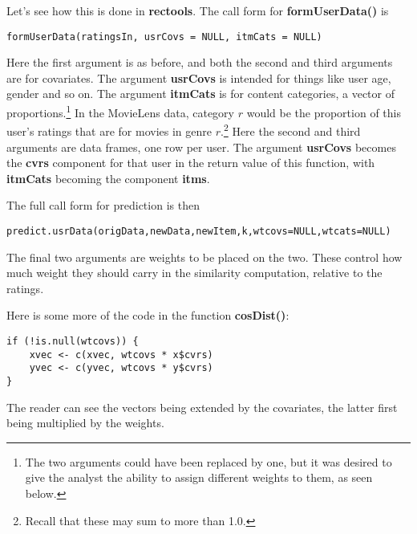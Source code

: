 Let's see how this is done in \textbf{rectools}.  The call form for
\textbf{formUserData()} is

\begin{lstlisting}
formUserData(ratingsIn, usrCovs = NULL, itmCats = NULL)
\end{lstlisting}

Here the first argument is as before, and both the second and third
arguments are for covariates.  The argument \textbf{usrCovs} is intended
for things like user age, gender and so on.  The argument
\textbf{itmCats} is for content categories, a vector of
proportions.\footnote{The two arguments could have been replaced by one,
but it was desired to give the analyst the ability to assign different
weights to them, as seen below.}  In the MovieLens data, category $r$
would be the proportion of this user's ratings that are for movies in
genre $r.$\footnote{Recall that these may sum to more than 1.0.} Here
the second and third arguments are data frames, one row per
user.  The argument \textbf{usrCovs} becomes the \textbf{cvrs} component
for that user in the return value of this function, with
\textbf{itmCats} becoming the component \textbf{itms}.

The full call form for prediction is then

\begin{lstlisting}
predict.usrData(origData,newData,newItem,k,wtcovs=NULL,wtcats=NULL)
\end{lstlisting}

The final two arguments are weights to be placed on the two.  These
control how much weight they should carry in the similarity computation,
relative to the ratings.

Here is some more of the code in the function \textbf{cosDist()}:

\begin{lstlisting}
if (!is.null(wtcovs)) {
    xvec <- c(xvec, wtcovs * x$cvrs)
    yvec <- c(yvec, wtcovs * y$cvrs)
}
\end{lstlisting}

The reader can see the vectors being extended by the covariates, the
latter first being multiplied by the weights.


\iffalse

idxs <- sample(1:nrow(ml),1000)
ml <- ml[,1:3]
mltrn <- ml[-idxs,]
mltst <- ml[idxs,]
library(rectools)
ud <- formUserData(mltrn)

k <- 5
z <- apply(mltst[,-3],1,pn); mean(abs(z-mltst[,3]),na.rm=T)

predname <- function(userData,oneInputRow,k)
{
   usr <- oneInputRow[1]
   itm <- oneInputRow[2]
   udElement <- userData[[as.character(usr)]]
   predict(userData,udElement,itm,k)
}

pn <- function(oneInputRow) predname(ud,oneInputRow,k)


\fi

